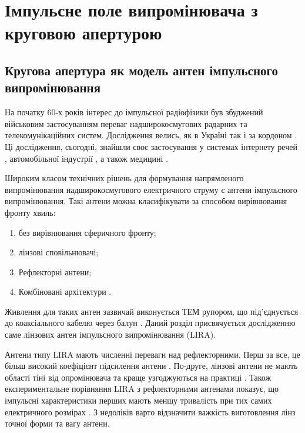 \chapter{Імпульсне поле випромінювача з круговою апертурою}
\label{ch:linear}

\section{Кругова апертура як модель антен імпульсного випромінювання}

На початку 60-х років інтерес до імпульсної радіофізики був збуджений
військовим застосуванням переваг надширокосмугових радарних та 
телекомунікаційних систем. Дослідження велись, як в Україні 
\cite{imp:Dumin1996} так і за кордоном \cite{imp:BaumIN0105}. Ці дослідження, сьогодні,
знайшли своє застосування у системах інтернету речей \cite{imp:Hartmann2015}, 
автомобільної індустрії \cite{imp:Yarovoy2017}, а також медицині 
\cite{imp:Cho2016}.

Широким класом технічних рішень для формування напрямленого випромінювання 
надширокосмугового електричного струму є антени імпульсного випромінювання.
Такі антени можна класифікувати за способом вирівнювання фронту хвиль:

\begin{enumerate}
	\item без вирівнювання сферичного фронту;
	\item лінзові сповільнювачі;
	\item Рефлекторні антени;
	\item Комбіновані архітектури \cite{imp:BaumSSN0379}.
\end{enumerate}

Живлення для таких антен зазвичай виконується ТЕМ рупором, що під'єднується 
до коаксіального кабелю через балун \cite{imp:BaumSSN0357}. Даний розділ 
присвячується дослідженню саме лінзових антен імпульсного випромінювання (LIRA). 

Антени типу LIRA мають численні переваги над рефлекторними. Перш за все, це
більш високий коефіцієнт підсилення антени \cite{imp:BaumUWBSP1}. По-друге,
лінзові антени не мають області тіні від опромінювача та краще узгоджуються
на практиці \cite{imp:BaumSSN0377}. Також експериментальне порівняння LIRA 
з рефлекторними антенами показує, що імпульсні характеристики перших мають 
меншу тривалість при тих самих електричного розмірах \cite{imp:BaumSSN0377}.
З недоліків варто відзначити важкість виготовлення лінз точної форми та 
вагу антени.

